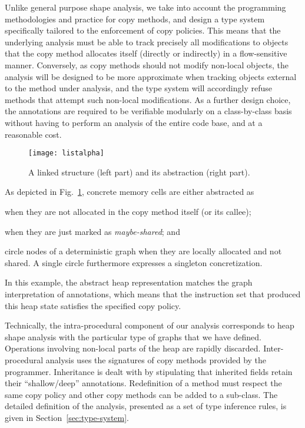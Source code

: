 \documentclass{LMCS}
\begin{document}
Unlike general purpose shape analysis, we take into account the programming
methodologies and practice for copy methods, and design a type system
specifically tailored to the enforcement of copy policies.  This means that
the underlying analysis must be able to track precisely all modifications to
objects that the copy method allocates itself (directly or indirectly) in a
flow-sensitive manner.  Conversely, as copy methods should not modify
non-local objects, the analysis will be designed to be more approximate when
tracking objects external to the method under analysis, and the type system
will accordingly refuse methods that attempt such non-local modifications. As
a further design choice, the annotations are required to be verifiable
modularly on a class-by-class basis without having to perform an analysis of
the entire code base, and at a reasonable cost.

\begin{figure}
  \centering
  \texttt{[image: listalpha]}
  \caption{A linked structure (left part) and its abstraction (right part).}
  \label{fig:listab}
\end{figure}

As depicted in Fig.~\ref{fig:listab}, concrete memory cells
are either abstracted as
\begin{inparaenum}
\item  when they are not allocated in the copy method itself (or its callee);
\item  when they are just marked as \emph{maybe-shared}; and
\item circle nodes of a deterministic graph when they are locally allocated and not shared. A single 
circle furthermore expresses a singleton concretization.
\end{inparaenum} 
In this example, the abstract heap representation matches the graph
interpretation of annotations, which means that the instruction set that
produced this heap state satisfies the specified copy policy.

Technically, the intra-procedural component of our analysis corresponds to
heap shape analysis with the particular type of graphs that we have defined.
Operations involving non-local parts of the heap are rapidly discarded.
Inter-procedural analysis uses the signatures of copy methods provided by the
programmer. Inheritance is dealt with by stipulating that inherited fields
retain their ``shallow/deep'' annotations.  Redefinition of a method must
respect the same copy policy and other copy methods can be added to a
sub-class. 
The detailed definition of the analysis, presented as a set of type inference
rules, is given in Section~\ref{sec:type-system}. 
\end{document}
